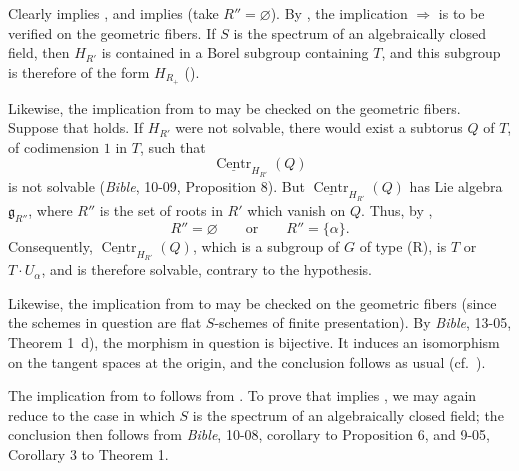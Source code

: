 Clearly \textup{} implies \textup{}, and \textup{}
implies \textup{} \textup{(take \(R''=\varnothing\))}. By ,
the implication \textup{}\(\Rightarrow\)\textup{} is to be verified on
the geometric fibers. If \(S\) is the spectrum of an algebraically
closed field, then \(H_{R'}\) is contained in a Borel subgroup
containing \(T\), and this subgroup is therefore of the form
\(H_{R_+}\) \textup{(\textup{})}.

Likewise, the implication from \textup{} to \textup{} may be
checked on the geometric fibers. Suppose that \textup{} holds.
If \(H_{R'}\) were not solvable, there would exist a subtorus \(Q\)
of \(T\), of codimension \(1\) in \(T\), such that
\[
  \underline{\operatorname{Centr}}_{H_{R'}}(Q)
\]
is not solvable \textup{(\emph{Bible}, 10-09, Proposition 8)}.
But \(\underline{\operatorname{Centr}}_{H_{R'}}(Q)\) has Lie algebra
\(\mathfrak g_{R''}\), where \(R''\) is the set of roots in \(R'\)
which vanish on \(Q\). Thus, by \textup{},
\[
  R''=\varnothing\qquad\text{or}\qquad R''=\{\alpha\}.
\]
Consequently,
\(\underline{\operatorname{Centr}}_{H_{R'}}(Q)\), which is a subgroup
of \(G\) of type \textup{(R)}, is \(T\) or \(T\cdot U_\alpha\), and
is therefore solvable, contrary to the hypothesis.

Likewise, the implication from \textup{} to \textup{} may be
checked on the geometric fibers \textup{(since the schemes in
question are flat \(S\)-schemes of finite presentation)}. By
\emph{Bible}, 13-05, Theorem 1~d), the morphism in question
is bijective. It induces an isomorphism on the tangent spaces at the
origin, and the conclusion follows as usual \textup{(cf.\ )}.

The implication from \textup{} to \textup{} follows from
. To prove that \textup{} implies \textup{}, we may again
reduce to the case in which \(S\) is the spectrum of an algebraically
closed field; the conclusion then follows from \emph{Bible}, 10-08,
corollary to Proposition 6, and 9-05, Corollary 3 to Theorem 1.

